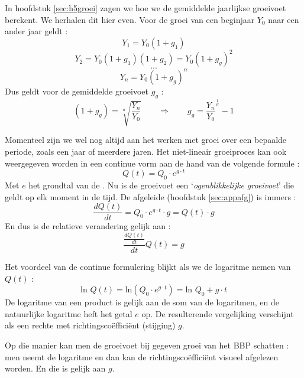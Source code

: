 \par In hoofdstuk \ref{sec:h5groei} zagen we hoe we de gemiddelde jaarlijkse groeivoet berekent. We herhalen dit hier even. Voor de groei van een beginjaar $Y_0$ naar een ander jaar geldt :
$$Y_1=Y_0(1+g_1)$$
$$Y_2=Y_0(1+g_1)(1+g_2)=Y_0(1+g_g)^2$$
$$...$$
$$Y_n=Y_0(1+g_g)^n$$
Dus geldt voor de gemiddelde groeivoet $g_g$ :
$$(1+g_g)=\sqrt[n]{\frac{Y_n}{Y_0}}\qquad\Rightarrow\qquad g_g=\frac{Y_n}{Y_0}^{\frac{1}{n}}-1$$ 

\par Momenteel zijn we wel nog altijd aan het werken met groei over een bepaalde periode, zoals een jaar of meerdere jaren. Het niet-lineair groeiproces kan ook weergegeven worden in een continue vorm aan de hand van de volgende formule :
$$Q(t)=Q_0\cdot e^{g\cdot t}$$
Met $e$ het grondtal van de . Nu is de groeivoet een `\textit{ogenblikkelijke groeivoet}' die geldt op elk moment in de tijd. De afgeleide (hoofdstuk \ref{sec:appafg}) is immers :
$$\frac{dQ(t)}{dt}=Q_0\cdot e^{g\cdot t}\cdot g=Q(t)\cdot g$$
En dus is de relatieve verandering gelijk aan :
$$\frac{\frac{dQ(t)}{dt}}{dt}{Q(t)}=g$$

\par Het voordeel van de continue formulering blijkt als we de logaritme nemen van $Q(t)$ :
$$\text{ln }Q(t)=\text{ln}\left(Q_0\cdot e^{g\cdot t}\right)=\text{ln }Q_0+g\cdot t$$
De logaritme van een product is gelijk aan de som van de logaritmen, en de natuurlijke logaritme heft het getal $e$ op. De resulterende vergelijking verschijnt als een rechte met richtingsco\"effici\"ent (stijging) $g$.
\par Op die manier kan men de groeivoet bij gegeven groei van het BBP schatten : men neemt de logaritme en dan kan de richtingsco\"effici\"ent visueel afgelezen worden. En die is gelijk aan $g$.
